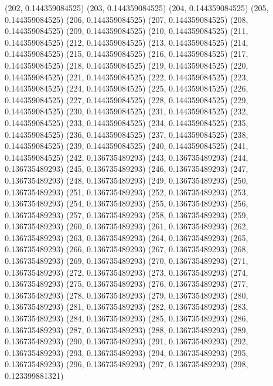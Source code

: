 {					(202, 0.144359084525)
					(203, 0.144359084525)
					(204, 0.144359084525)
					(205, 0.144359084525)
					(206, 0.144359084525)
					(207, 0.144359084525)
					(208, 0.144359084525)
					(209, 0.144359084525)
					(210, 0.144359084525)
					(211, 0.144359084525)
					(212, 0.144359084525)
					(213, 0.144359084525)
					(214, 0.144359084525)
					(215, 0.144359084525)
					(216, 0.144359084525)
					(217, 0.144359084525)
					(218, 0.144359084525)
					(219, 0.144359084525)
					(220, 0.144359084525)
					(221, 0.144359084525)
					(222, 0.144359084525)
					(223, 0.144359084525)
					(224, 0.144359084525)
					(225, 0.144359084525)
					(226, 0.144359084525)
					(227, 0.144359084525)
					(228, 0.144359084525)
					(229, 0.144359084525)
					(230, 0.144359084525)
					(231, 0.144359084525)
					(232, 0.144359084525)
					(233, 0.144359084525)
					(234, 0.144359084525)
					(235, 0.144359084525)
					(236, 0.144359084525)
					(237, 0.144359084525)
					(238, 0.144359084525)
					(239, 0.144359084525)
					(240, 0.144359084525)
					(241, 0.144359084525)
					(242, 0.136735489293)
					(243, 0.136735489293)
					(244, 0.136735489293)
					(245, 0.136735489293)
					(246, 0.136735489293)
					(247, 0.136735489293)
					(248, 0.136735489293)
					(249, 0.136735489293)
					(250, 0.136735489293)
					(251, 0.136735489293)
					(252, 0.136735489293)
					(253, 0.136735489293)
					(254, 0.136735489293)
					(255, 0.136735489293)
					(256, 0.136735489293)
					(257, 0.136735489293)
					(258, 0.136735489293)
					(259, 0.136735489293)
					(260, 0.136735489293)
					(261, 0.136735489293)
					(262, 0.136735489293)
					(263, 0.136735489293)
					(264, 0.136735489293)
					(265, 0.136735489293)
					(266, 0.136735489293)
					(267, 0.136735489293)
					(268, 0.136735489293)
					(269, 0.136735489293)
					(270, 0.136735489293)
					(271, 0.136735489293)
					(272, 0.136735489293)
					(273, 0.136735489293)
					(274, 0.136735489293)
					(275, 0.136735489293)
					(276, 0.136735489293)
					(277, 0.136735489293)
					(278, 0.136735489293)
					(279, 0.136735489293)
					(280, 0.136735489293)
					(281, 0.136735489293)
					(282, 0.136735489293)
					(283, 0.136735489293)
					(284, 0.136735489293)
					(285, 0.136735489293)
					(286, 0.136735489293)
					(287, 0.136735489293)
					(288, 0.136735489293)
					(289, 0.136735489293)
					(290, 0.136735489293)
					(291, 0.136735489293)
					(292, 0.136735489293)
					(293, 0.136735489293)
					(294, 0.136735489293)
					(295, 0.136735489293)
					(296, 0.136735489293)
					(297, 0.136735489293)
					(298, 0.123399881321)
}

